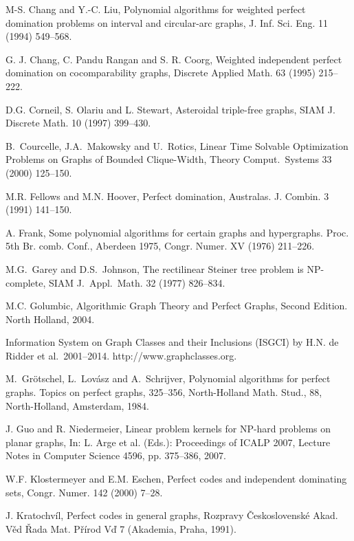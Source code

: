 \documentclass[]{elsarticle}
\begin{document}
\begin{thebibliography}{10}
M-S. Chang and Y.-C. Liu,
Polynomial algorithms for weighted perfect domination problems on interval and circular-arc graphs,
J. Inf. Sci. Eng. 11 (1994) 549--568.

G. J. Chang, C. Pandu Rangan and S. R. Coorg,
 Weighted independent perfect domination on cocomparability graphs,
 Discrete Applied Math. 63 (1995) 215--222.

D.G. Corneil, S. Olariu and L. Stewart, Asteroidal triple-free graphs, SIAM J. Discrete
Math. 10 (1997) 399--430.

B.~Courcelle, J.A.~Makowsky and U.~Rotics, Linear Time Solvable
Optimization Problems on Graphs of Bounded Clique-Width, Theory
Comput.~Systems 33 (2000) 125--150.

M.R. Fellows and M.N. Hoover, Perfect domination, Australas. J. Combin. 3 (1991) 141--150.

A. Frank,
Some polynomial algorithms for certain graphs and hypergraphs.
Proc. 5th Br. comb. Conf., Aberdeen 1975, Congr. Numer. XV (1976) 211--226.

 M.G.~Garey and D.S.~Johnson, The rectilinear Steiner
tree problem is NP-complete, SIAM J.~Appl.~Math. 32 (1977)
826--834.

M.C. Golumbic, Algorithmic Graph Theory and Perfect Graphs, Second Edition. North Holland, 2004.

Information System on Graph Classes and their Inclusions (ISGCI)
by H.N. de Ridder et al.~2001--{2014}.
http://www.graphclasses.org.

 M.~Gr\"otschel, L.~Lov\'asz and A.~Schrijver, Polynomial algorithms for
perfect graphs. Topics on perfect graphs, 325--356, North-Holland
Math. Stud., 88, North-Holland, Amsterdam, 1984.

J. Guo and R. Niedermeier,
Linear problem kernels for NP-hard problems on planar graphs,
In: L. Arge et al. (Eds.): Proceedings of ICALP 2007, Lecture Notes in Computer Science 4596, pp. 375–386, 2007.

W.F. Klostermeyer and E.M. Eschen,
Perfect codes and independent dominating sets,
Congr. Numer. 142 (2000) 7--28.

J. Kratochv\'il, Perfect codes in general graphs, Rozpravy \v Ceskoslovensk\'e Akad. V\v ed \v Rada
Mat. P\v r\'irod V\v d 7 (Akademia, Praha, 1991).


\end{thebibliography}
\end{document}
